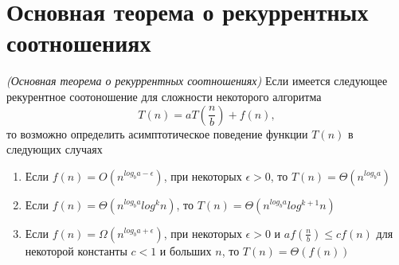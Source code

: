 \section{Основная теорема о рекуррентных соотношениях}

\begin{theorem}
\emph{(Основная теорема о рекуррентных соотношениях)}
\label{addAlgoMasterTheorem}
Если имеется следующее рекурентное соотоношение для сложности
некоторого алгоритма
\[
T\left( n \right ) = a T \left( \frac{n}{b} \right) + f\left( n \right ),
\]
то возможно определить асимптотическое поведение функции 
$T\left( n\right ) $ в следующих случаях
\begin{enumerate}
\item Если $f\left(n\right) = O\left( n^{log_ba - \epsilon}\right)$,
  при некоторых $\epsilon > 0$, то 
$T\left(n\right) = \Theta\left(n^{log_ba}\right)$
\item Если 
$f\left(n\right) = \Theta\left( n^{log_ba}log^{k}n\right)$, то 
$T\left(n\right) = \Theta\left(n^{log_ba}log^{k + 1}n\right)$
\item Если $f\left(n\right) = \Omega\left( n^{log_ba + \epsilon}\right)$,
  при некоторых $\epsilon > 0$ и $a f\left(\frac{n}{b}\right) \le c f
  \left( n \right)$ для некоторой константы $c < 1$ и больших $n$, то 
$T\left(n\right) = \Theta\left(f\left(n\right)\right)$
\end{enumerate}
\end{theorem}
